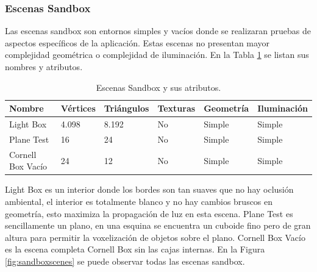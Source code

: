 \subsubsection{Escenas Sandbox}

Las escenas sandbox son entornos simples y vacíos donde se realizaran pruebas de aspectos específicos de la aplicación. Estas escenas no presentan mayor complejidad geométrica o complejidad de iluminación. En la Tabla \ref{tab:sandbox} se listan sus nombres y atributos.

\begin{table}[h]
\centering
\begin{tabular}{|l|l|l|l|l|l|}
\hline
Nombre            & Vértices & Triángulos & Texturas & Geometría & Iluminación \\ \hline
Light Box         & 4.098    & 8.192      & No       & Simple    & Simple        \\ \hline
Plane Test        & 16       & 24         & No       & Simple    & Simple       \\ \hline
Cornell Box Vacío & 24       & 12         & No       & Simple    & Simple       \\ \hline
\end{tabular}
\caption{Escenas Sandbox y sus atributos.}
\label{tab:sandbox}
\end{table}

Light Box es un interior donde los bordes son tan suaves que no hay oclusión ambiental, el interior es totalmente blanco y no hay cambios bruscos en geometría, esto maximiza la propagación de luz en esta escena. Plane Test es sencillamente un plano, en una esquina se encuentra un cuboide fino pero de gran altura para permitir la voxelización de objetos sobre el plano. Cornell Box Vacío es la escena completa Cornell Box sin las cajas internas. En la Figura \ref{fig:sandboxscenes} se puede observar todas las escenas sandbox.

